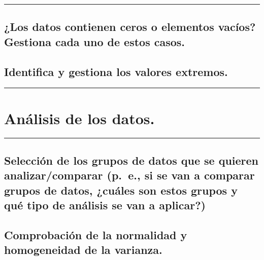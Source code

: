 \documentclass[
]{article}
\begin{document}
\begin{center}\rule{0.5\linewidth}{0.5pt}\end{center}

\hypertarget{los-datos-contienen-ceros-o-elementos-vacuxedos-gestiona-cada-uno-de-estos-casos.}{%
\subsection{¿Los datos contienen ceros o elementos vacíos? Gestiona cada
uno de estos
casos.}\label{los-datos-contienen-ceros-o-elementos-vacuxedos-gestiona-cada-uno-de-estos-casos.}}

\hypertarget{identifica-y-gestiona-los-valores-extremos.}{%
\subsection{Identifica y gestiona los valores
extremos.}\label{identifica-y-gestiona-los-valores-extremos.}}

\begin{center}\rule{0.5\linewidth}{0.5pt}\end{center}

\hypertarget{anuxe1lisis-de-los-datos.}{%
\section{Análisis de los datos.}\label{anuxe1lisis-de-los-datos.}}

\begin{center}\rule{0.5\linewidth}{0.5pt}\end{center}

\hypertarget{selecciuxf3n-de-los-grupos-de-datos-que-se-quieren-analizarcomparar-p.-e.-si-se-van-a-comparar-grupos-de-datos-cuuxe1les-son-estos-grupos-y-quuxe9-tipo-de-anuxe1lisis-se-van-a-aplicar}{%
\subsection{Selección de los grupos de datos que se quieren
analizar/comparar (p.~e., si se van a comparar grupos de datos, ¿cuáles
son estos grupos y qué tipo de análisis se van a
aplicar?)}\label{selecciuxf3n-de-los-grupos-de-datos-que-se-quieren-analizarcomparar-p.-e.-si-se-van-a-comparar-grupos-de-datos-cuuxe1les-son-estos-grupos-y-quuxe9-tipo-de-anuxe1lisis-se-van-a-aplicar}}

\hypertarget{comprobaciuxf3n-de-la-normalidad-y-homogeneidad-de-la-varianza.}{%
\subsection{Comprobación de la normalidad y homogeneidad de la
varianza.}\label{comprobaciuxf3n-de-la-normalidad-y-homogeneidad-de-la-varianza.}}
\end{document}
